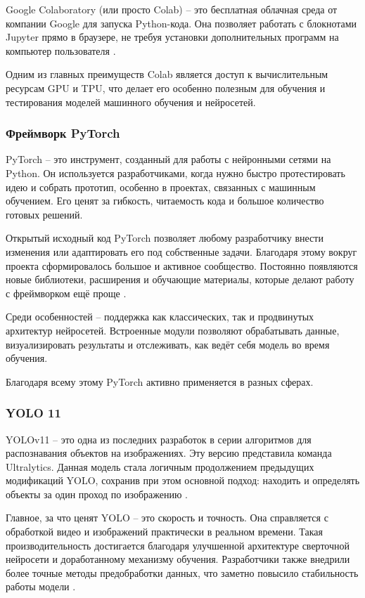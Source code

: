Google Colaboratory (или просто Colab) -- это бесплатная облачная среда от компании Google для запуска Python-кода. Она позволяет работать с блокнотами Jupyter прямо в браузере, не требуя установки дополнительных программ на компьютер пользователя \cite{colab1}.

Одним из главных преимуществ Colab является доступ к вычислительным ресурсам GPU и TPU, что делает его особенно полезным для обучения и тестирования моделей машинного обучения и нейросетей.

\subsubsection{Фреймворк PyTorch}

PyTorch -- это инструмент, созданный для работы с нейронными сетями на Python. Он используется разработчиками, когда нужно быстро протестировать идею и собрать прототип, особенно в проектах, связанных с машинным обучением. Его ценят за гибкость, читаемость кода и большое количество готовых решений.

Открытый исходный код PyTorch позволяет любому разработчику внести изменения или адаптировать его под собственные задачи. Благодаря этому вокруг проекта сформировалось большое и активное сообщество. Постоянно появляются новые библиотеки, расширения и обучающие материалы, которые делают работу с фреймворком ещё проще \cite{yolo6}.

Среди особенностей -- поддержка как классических, так и продвинутых архитектур нейросетей. Встроенные модули позволяют обрабатывать данные, визуализировать результаты и отслеживать, как ведёт себя модель во время обучения.

Благодаря всему этому PyTorch активно применяется в разных сферах.

\subsubsection{YOLO 11}

YOLOv11 -- это одна из последних разработок в серии алгоритмов для распознавания объектов на изображениях. Эту версию представила команда Ultralytics. Данная модель стала логичным продолжением предыдущих модификаций YOLO, сохранив при этом основной подход: находить и определять объекты за один проход по изображению \cite{yolo8}.

Главное, за что ценят YOLO -- это скорость и точность. Она справляется с обработкой видео и изображений практически в реальном времени. Такая производительность достигается благодаря улучшенной архитектуре сверточной нейросети и доработанному механизму обучения. Разработчики также внедрили более точные методы предобработки данных, что заметно повысило стабильность работы модели \cite{yolo2}. 

